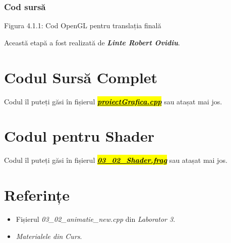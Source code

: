 \documentclass[12pt]{report}
\begin{document}
    \subsection{Cod sursă}
    
    \begin{center}
        Figura 4.1.1: Cod OpenGL pentru translația finală
    \end{center}

    Această etapă a fost realizată de \emph{\textbf{Linte Robert Ovidiu}}.

    \newpage
    \chapter{Codul Sursă Complet}
    Codul îl puteți găsi în fișierul \href{https://github.com/linterobert/Proiect-Grafica/blob/master/GraphicsProject/GraphicsProject/proiectGrafica.cpp}{\textbf{\emph{\hl{proiectGrafica.cpp}}}} sau atașat mai jos.
    
    
    \newpage
    \chapter{Codul pentru Shader}
    Codul îl puteți găsi în fișierul \href{https://github.com/linterobert/Proiect-Grafica/blob/master/GraphicsProject/GraphicsProject/03_02_Shader.frag}{\textbf{\emph{\hl{03\_02\_Shader.frag}}}} sau atașat mai jos.
    
    
    \newpage
    \chapter{Referințe}
    \begin{itemize}
        \item Fișierul \emph{03\_02\_animatie\_new.cpp} din \emph{Laborator 3}.
        \item \emph{Materialele din Curs}.
    \end{itemize}
\end{document}
